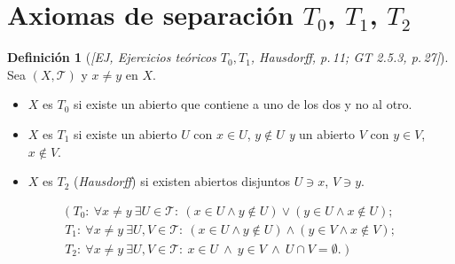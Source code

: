 \documentclass[11pt,a4paper]{article}
\newcommand{\lgc}[1]{\par\vspace{-3pt}\begin{gather*}\big(\;#1\;\big)\end{gather*}\vspace{-6pt}}
\theoremstyle{definition}
\newtheorem{definicion}{Definición}[section]
\theoremstyle{plain}
\newcommand{\fnt}[1]{{\normalfont\small\itshape\color{gray!150!black}[#1]}}
\newcommand{\tp}{\mathcal{T}}
\begin{document}
\section{Axiomas de separación $T_0$, $T_1$, $T_2$}\label{sec:sep}

\begin{definicion}[\fnt{EJ, Ejercicios teóricos $T_0,T_1$, Hausdorff, p.\,11; GT 2.5.3, p.\,27}]
Sea $(X,\tp)$ y $x\ne y$ en $X$.
\begin{itemize}[leftmargin=1.4em,itemsep=1pt]
\item $X$ es $T_0$ si existe un abierto que contiene a uno de los dos y no al otro.
\item $X$ es $T_1$ si existe un abierto $U$ con $x\in U$, $y\notin U$ \emph{y} un abierto $V$ con $y\in V$, $x\notin V$.
\item $X$ es $T_2$ (\emph{Hausdorff}) si existen abiertos disjuntos $U\ni x$, $V\ni y$.
\end{itemize}
\lgc{T_0:\ \forall x\ne y\ \exists U\in\tp:\ (x\in U\wedge y\notin U)\vee(y\in U\wedge x\notin U);\\
T_1:\ \forall x\ne y\ \exists U,V\in\tp:\ (x\in U\wedge y\notin U)\wedge(y\in V\wedge x\notin V);\\
T_2:\ \forall x\ne y\ \exists U,V\in\tp:\ x\in U\ \wedge\ y\in V\ \wedge\ U\cap V=\emptyset.}
\end{definicion}
\end{document}
